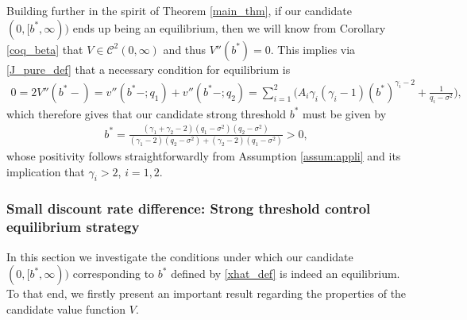 \documentclass[11pt]{article} %
\numberwithin{komcounter}{section}
\begin{document}
Building further in the spirit of Theorem \ref{main_thm}, if our candidate $(0,[b^*,\infty))$ ends up being an equilibrium, then we will know from Corollary \ref{coq_beta} that  $V \in \mathcal{C}^2(0,\infty)$ and thus $V''(b^*)=0$. 
This implies via \eqref{J_pure_def} that a necessary condition for equilibrium is
\begin{align}\label{sfsdfdsas}
0 
= 2 V''(b^*-) = v''(b^*-;q_1) + v''(b^*-;q_2) = \sum_{i=1}^2 \Big( A_i \gamma_i (\gamma_i-1) (b^*)^{\gamma_i-2} + \frac{1}{q_i-\sigma^2} \Big),
\end{align}
which therefore gives that our candidate strong threshold $b^*$ must be given by 
\begin{align} \label{xhat_def}
b^*=\frac{(\gamma_1 + \gamma_2 - 2)(q_1 - \sigma^2)(q_2 - \sigma^2)}{(\gamma_1 - 2)(q_2 - \sigma^2) + (\gamma_2 - 2)(q_1 - \sigma^2)}
>0,
\end{align}
whose positivity follows straightforwardly from Assumption \ref{assum:appli} and its implication that $\gamma_i>2$, $i=1,2$.  


\subsubsection{Small discount rate difference: Strong threshold control equilibrium strategy} 
\label{sec:Equib}

In this section we investigate the conditions under which our candidate $(0,[b^*,\infty))$ corresponding to $b^*$ defined by \eqref{xhat_def} is indeed an equilibrium. 
To that end, we firstly present an important result regarding the properties of the candidate value function $V$.
\end{document}

